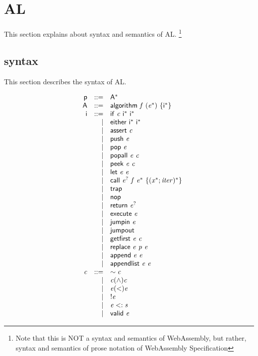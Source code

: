 \section{AL}\label{sec:al}

This section explains about syntax and semantics of AL.
\footnote{Note that this is NOT a syntax and semantics of WebAssembly, but rather,
syntax and semantics of prose notation of WebAssembly Specification}

\subsection{syntax}

This section describes the syntax of AL.

\begin{minipage}{0.5\textwidth}
$$
\begin{array}{@{}lrrl@{}}
& \mathsf{p} &::=& {\mathsf{A}^\ast} \\
& \mathsf{A} &::=& \mathsf{algorithm}~\mathit{f}~({\mathit{e}^\ast})~\{{\mathsf{i}^\ast}\} \\
& \mathsf{i} &::=& \mathsf{if}~\mathit{c}~{\mathsf{i}^\ast}~{\mathsf{i}^\ast} \\ &&|&
\mathsf{either}~{\mathsf{i}^\ast}~{\mathsf{i}^\ast} \\ &&|&
\mathsf{assert}~\mathit{c} \\ &&|&
\mathsf{push}~\mathit{e} \\ &&|&
\mathsf{pop}~\mathit{e} \\ &&|&
\mathsf{popall}~\mathit{e}~\mathit{c} \\ &&|&
\mathsf{peek}~\mathit{e}~\mathit{c} \\ &&|&
\mathsf{let}~\mathit{e}~\mathit{e} \\ &&|&
\mathsf{call}~{\mathit{e}^?}~\mathit{f}~{\mathit{e}^\ast}~\{{({\mathit{x}^\ast} ; \mathit{iter})^\ast}\} \\ &&|&
\mathsf{trap} \\ &&|&
\mathsf{nop} \\ &&|&
\mathsf{return}~{\mathit{e}^?} \\ &&|&
\mathsf{execute}~\mathit{e} \\ &&|&
\mathsf{jumpin}~\mathit{e} \\ &&|&
\mathsf{jumpout} \\ &&|&
\mathsf{getfirst}~\mathit{e}~\mathit{c} \\ &&|&
\mathsf{replace}~\mathit{e}~\mathit{p}~\mathit{e} \\ &&|&
\mathsf{append}~\mathit{e}~\mathit{e} \\ &&|&
\mathsf{appendlist}~\mathit{e}~\mathit{e} \\
& \mathit{c} &::=& \sim\mathit{c} \\ &&|&
\mathit{c}(\wedge)\mathit{c} \\ &&|&
\mathit{e}(<)\mathit{e} \\ &&|&
!\mathit{e} \\ &&|&
\mathit{e}<:\mathit{s} \\ &&|&
\mathsf{valid}~\mathit{e} \\
\end{array}
$$
\end{minipage}
